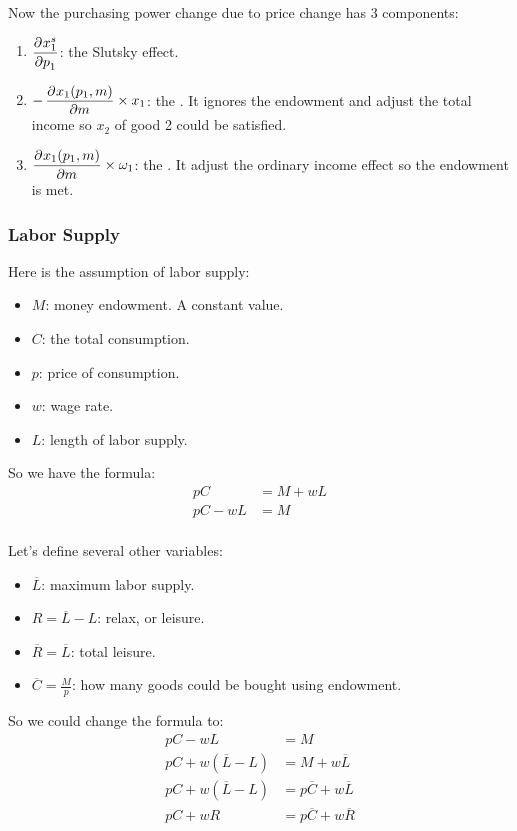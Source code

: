 Now the purchasing power change due to price change has 3 components:
\begin{enumerate}
    \item $\dpd{x_1^s}{p_1}$: the Slutsky effect.
    \item $-\dpd{x_1(p_1, m)}{m} \times x_1$: the  . It ignores the endowment and adjust the total income so $x_2$ of good 2 could be satisfied.
    \item $\dpd{x_1(p_1, m)}{m} \times \omega_1$: the  . It adjust the ordinary income effect so the endowment is met.
\end{enumerate}


\subsubsection{Labor Supply}

Here is the assumption of labor supply:
\begin{itemize}
    \item $M$: money endowment. A constant value.
    \item $C$: the total consumption.
    \item $p$: price of consumption.
    \item $w$: wage rate.
    \item $L$: length of labor supply.
\end{itemize}

So we have the formula:
\begin{equation}
    \begin{aligned}
    pC &= M + wL \\
    pC - wL &= M \\     
    \end{aligned}
\end{equation}

Let's define several other variables:
\begin{itemize}
    \item $\overline{L}$: maximum labor supply.
    \item $R= \overline{L} - L$: relax, or leisure.
    \item $\overline{R} = \overline{L}$: total leisure.
    \item $\displaystyle \overline{C} = \frac{M}{p}$: how many goods could be bought using endowment.
\end{itemize}

So we could change the formula to:
\begin{equation}
    \begin{aligned}
        pC - wL &= M \\
        pC + w(\overline{L} - L) &= M + w \overline{L} \\
        pC + w(\overline{L} - L) &= p \overline{C} + w \overline{L} \\
        pC + wR &= p \overline{C} + w \overline{R} \\
    \end{aligned}
\end{equation}

